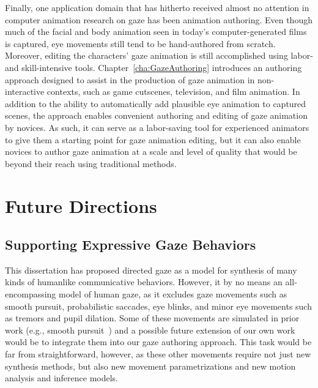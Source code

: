 Finally, one application domain that has hitherto received almost no attention in computer animation research on gaze has been animation authoring. Even though much of the facial and body animation seen in today's computer-generated films is captured, eye movements still tend to be hand-authored from scratch. Moreover, editing the characters' gaze animation is still accomplished using labor- and skill-intensive tools. Chapter~\ref{cha:GazeAuthoring} introduces an authoring approach designed to assist in the production of gaze animation in non-interactive contexts, such as game cutscenes, television, and film animation. In addition to the ability to automatically add plausible eye animation to captured scenes, the approach enables convenient authoring and editing of gaze animation by novices. As such, it can serve as a labor-saving tool for experienced animators to give them a starting point for gaze animation editing, but it can also enable novices to author gaze animation at a scale and level of quality that would be beyond their reach using traditional methods.

\section{Future Directions}

\subsection{Supporting Expressive Gaze Behaviors}

This dissertation has proposed directed gaze as a model for synthesis of many kinds of humanlike communicative behaviors. However, it by no means an all-encompassing model of human gaze, as it excludes gaze movements such as smooth pursuit, probabilistic saccades, eye blinks, and minor eye movements such as tremors and pupil dilation. Some of these movements are simulated in prior work (e.g., smooth pursuit~\citep{yeo2012eyecatch}) and a possible future extension of our own work would be to integrate them into our gaze authoring approach. This task would be far from straightforward, however, as these other movements require not just new synthesis methods, but also new movement parametrizations and new motion analysis and inference models.

